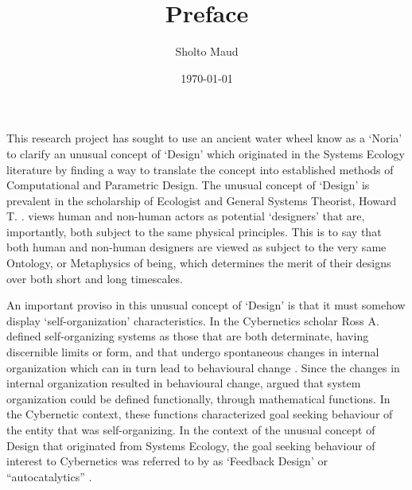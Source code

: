 \documentclass[a4paper,12pt]{article}
\title{%
Preface
}
\author{Sholto Maud}
\date{\today}
\begin{document}
\maketitle



\newpage
\tableofcontents
{}

\newpage

This research project has sought to use an ancient water wheel know as a `Noria' to clarify an unusual concept of `Design' which originated in the Systems Ecology literature by 
finding a way to translate the concept into established methods of Computational and Parametric Design. The unusual concept of `Design' is prevalent in the scholarship of Ecologist and General Systems Theorist, Howard T. \citeauthor{odum_emergy_1991}. \citeauthor{odum_emergy_1991} views human and non-human actors as potential `designers' that are, importantly, both subject to the same physical principles. This is to say that both human and non-human designers are viewed as subject to the very same Ontology, or Metaphysics of being, which determines the merit of their designs over both short and long timescales. 

An important proviso in this unusual concept of `Design' is that it must somehow display `self-organization' characteristics. In \citeyear{ashby_principles_1947} the Cybernetics scholar Ross A. \citeauthor{ashby_principles_1947} defined self-organizing systems as those that are both determinate, having discernible limits or form, and that undergo spontaneous changes in internal organization which can in turn lead to behavioural change \citep[p.~125]{ashby_principles_1947}. Since the changes in internal organization resulted in behavioural change, \citeauthor{ashby_principles_1947} argued that system organization could be defined functionally, through mathematical functions. In the Cybernetic context, these functions characterized goal seeking behaviour of the entity that was self-organizing. In the context of the unusual concept of Design that originated from Systems Ecology, the goal seeking behaviour of interest to Cybernetics was referred to by \citeauthor{odum_systems_1983} as `Feedback Design' or ``autocatalytics'' \citep[pp.~6,451]{odum_systems_1983}.
\end{document}
